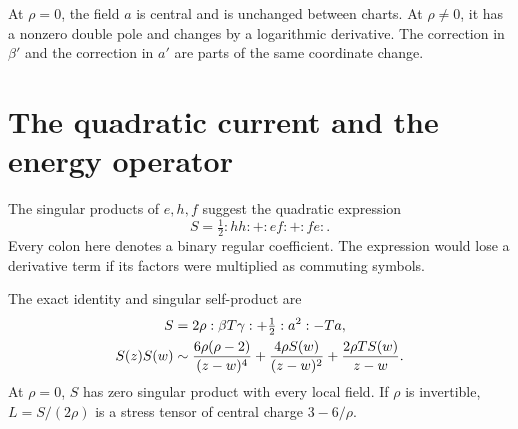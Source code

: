 At $\rho=0$, the field $a$ is central and is unchanged between charts.
At $\rho\ne0$, it has a nonzero double pole and changes by a logarithmic derivative.
The correction in $\beta'$ and the correction in $a'$ are parts of the same coordinate change.

\section{The quadratic current and the energy operator}

The singular products of $e,h,f$ suggest the quadratic expression
\[
 S=\tfrac12:hh:+:ef:+:fe:.
\]
Every colon here denotes a binary regular coefficient.
The expression would lose a derivative term if its factors were multiplied as commuting symbols.

\begin{proposition}\label{prop:cc-sugawara}
The exact identity and singular self-product are
\begin{align}
 S&=2\rho:\beta T\gamma:+\tfrac12:a^2:-Ta,\label{eq:cc-miura}\\
 S(z)S(w)&\sim
 \frac{6\rho(\rho-2)}{(z-w)^4}
 +\frac{4\rho S(w)}{(z-w)^2}
 +\frac{2\rho TS(w)}{z-w}.\notag
\end{align}
At $\rho=0$, $S$ has zero singular product with every local field.
If $\rho$ is invertible, $L=S/(2\rho)$ is a stress tensor of central charge $3-6/\rho$.
\end{proposition}
